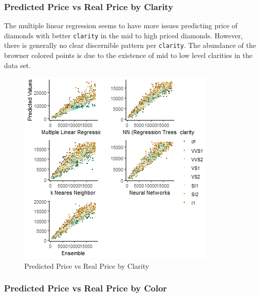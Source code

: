 \documentclass[
  paper=a4,
  ,captions=tableheading
]{scrartcl}
\begin{document}
\hypertarget{predicted-price-vs-real-price-by-clarity}{%
\subsubsection{Predicted Price vs Real Price by
Clarity}\label{predicted-price-vs-real-price-by-clarity}}

The multiple linear regression seems to have more issues predicting
price of diamonds with better \texttt{clarity} in the mid to high priced
diamonds. However, there is generally no clear discernible pattern per
\texttt{clarity}. The abundance of the browner colored points is due to
the existence of mid to low level clarities in the data set.

\begin{figure}[H]

{\centering \includegraphics[width=\linewidth,]{Diamonds_PDF_files/figure-latex/Ensemble Summary Plot-1}

}

\caption{Predicted Price vs Real Price by Clarity}\label{fig:Ensemble Summary Plot}
\end{figure}

\newpage

\hypertarget{predicted-price-vs-real-price-by-color}{%
\subsubsection{Predicted Price vs Real Price by
Color}\label{predicted-price-vs-real-price-by-color}}
\end{document}
